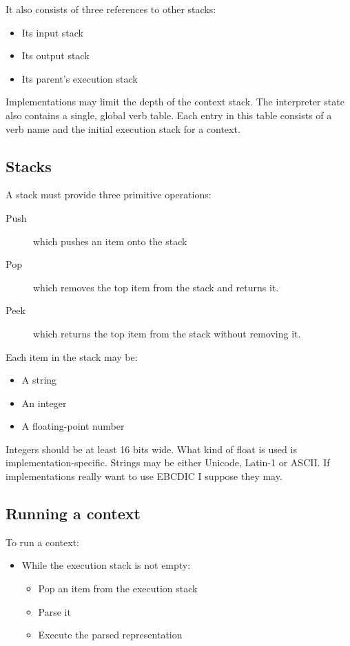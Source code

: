 \documentclass{article}
\begin{document}
{{{{{\noindent It also consists of three references to other stacks:

\begin{itemize}
\item Its input stack
\item Its output stack
\item Its parent's execution stack
\end{itemize}

\noindent Implementations may limit the depth of the context stack.
The interpreter state also contains a single, global verb table.  Each entry in this table consists of a verb name and the initial execution stack for a context.

\subsection{Stacks}

A stack must provide three primitive operations:

\begin{description}
\item[Push] which pushes an item onto the stack
\item[Pop] which removes the top item from the stack and returns it.
\item[Peek] which returns the top item from the stack without removing it.
\end{description}

Each item in the stack may be:

\begin{itemize}
\item A string
\item An integer
\item A floating-point number
\end{itemize}

Integers should be at least 16 bits wide.  What kind of float is used is implementation-specific.  Strings may be either Unicode, Latin-1 or ASCII.  If implementations really want to use EBCDIC I suppose they may.

\subsection{Running a context}

To run a context:

\begin{itemize}
\item While the execution stack is not empty:
\begin{itemize}
\item Pop an item from the execution stack
\item Parse it
\item Execute the parsed representation
\end{itemize}
\end{itemize}

}}}}}
\end{document}
